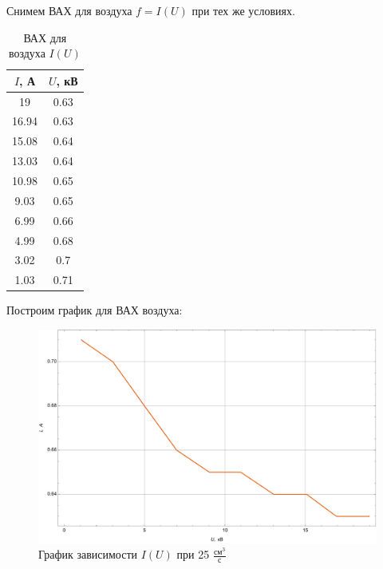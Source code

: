 \documentclass[a4paper, 12pt]{article}
\begin{document}
\par
Снимем ВАХ для воздуха $f=I\left(U\right)$ при тех же условиях.
\begin{table}[h!]
\centering
\begin{tabular}{|c|c|}
\hline
$I$, А & $U$, кВ \\
\hline
19 & 0.63 \\
\hline
16.94 & 0.63 \\
\hline
15.08 & 0.64 \\
\hline
13.03 & 0.64 \\
\hline
10.98 & 0.65 \\
\hline
9.03 & 0.65 \\
\hline
6.99 & 0.66 \\
\hline
4.99 & 0.68 \\
\hline
3.02 & 0.7 \\
\hline
1.03 & 0.71 \\
\hline
\end{tabular}
\caption{ВАХ для воздуха $I\left(U\right)$}
\end{table}
\par
Построим график для ВАХ воздуха:
\begin{figure}[h!]
\centering
\includegraphics[scale=0.5]{MyGraph2.pdf}
\caption{График зависимости $I\left(U\right)$ при 25 $\frac{\text{см}^3}{\text{с}}$}
\label{fig:exp2}
\end{figure}
\newpage
\end{document}
